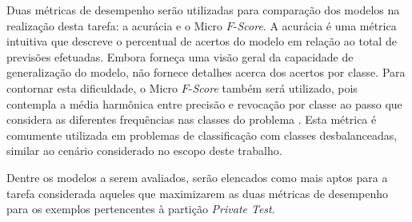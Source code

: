 Duas métricas de desempenho serão utilizadas para comparação dos modelos na realização desta tarefa: a acurácia e o Micro $F$-\emph{Score}. A acurácia é uma métrica intuitiva que descreve o percentual de acertos do modelo em relação ao total de previsões efetuadas. Embora forneça uma visão geral da capacidade de generalização do modelo, não fornece detalhes acerca dos acertos por classe. Para contornar esta dificuldade, o Micro $F$-\emph{Score} também será utilizado, pois contempla a média harmônica entre precisão e revocação por classe ao passo que considera as diferentes frequências nas classes do problema \cite{Kubat:Livro}. Esta métrica é comumente utilizada em problemas de classificação com classes desbalanceadas, similar ao cenário considerado no escopo deste trabalho.

Dentre os modelos a serem avaliados, serão elencados como mais aptos para a tarefa considerada aqueles que maximizarem as duas métricas de desempenho para os exemplos pertencentes à partição \emph{Private Test}.






